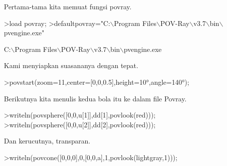 \documentclass[a4paper,10pt]{article}
\begin{document}
\begin{eulernotebook}
\begin{eulercomment}
\begin{eulercomment}
\begin{eulercomment}
\begin{eulercomment}
\begin{eulercomment}
\begin{eulercomment}
\begin{eulercomment}
\begin{eulercomment}
\begin{eulercomment}
\begin{eulercomment}
\begin{eulercomment}
\begin{eulercomment}
\begin{eulercomment}
\begin{eulercomment}
\begin{eulercomment}
\begin{eulercomment}
\begin{eulercomment}
\begin{eulercomment}
\begin{eulercomment}
\begin{eulercomment}
\begin{eulercomment}
\begin{eulercomment}
\begin{eulercomment}
\begin{eulercomment}
\begin{eulercomment}
\begin{eulercomment}
\begin{eulercomment}
\begin{eulercomment}
\begin{eulercomment}
\begin{eulercomment}
\begin{eulercomment}
\begin{eulercomment}
\begin{eulercomment}
\begin{eulercomment}
\begin{eulercomment}
\begin{eulercomment}
\begin{eulercomment}
\begin{eulercomment}
\begin{eulercomment}
\begin{eulercomment}
\begin{eulercomment}
\begin{eulercomment}
\begin{eulercomment}
Pertama-tama kita memuat fungsi povray.
\end{eulercomment}
\begin{eulerprompt}
>load povray;
>defaultpovray="C:\(\backslash\)Program Files\(\backslash\)POV-Ray\(\backslash\)v3.7\(\backslash\)bin\(\backslash\)pvengine.exe"
\end{eulerprompt}
\begin{euleroutput}
  C:\(\backslash\)Program Files\(\backslash\)POV-Ray\(\backslash\)v3.7\(\backslash\)bin\(\backslash\)pvengine.exe
\end{euleroutput}
\begin{eulercomment}
Kami menyiapkan suasananya dengan tepat.
\end{eulercomment}
\begin{eulerprompt}
>povstart(zoom=11,center=[0,0,0.5],height=10°,angle=140°);
\end{eulerprompt}
\begin{eulercomment}
Berikutnya kita menulis kedua bola itu ke dalam file Povray.
\end{eulercomment}
\begin{eulerprompt}
>writeln(povsphere([0,0,u[1]],dd[1],povlook(red)));
>writeln(povsphere([0,0,u[2]],dd[2],povlook(red)));
\end{eulerprompt}
\begin{eulercomment}
Dan kerucutnya, transparan.
\end{eulercomment}
\begin{eulerprompt}
>writeln(povcone([0,0,0],0,[0,0,a],1,povlook(lightgray,1)));

\end{eulerprompt}
\end{eulercomment}
\end{eulercomment}
\end{eulercomment}
\end{eulercomment}
\end{eulercomment}
\end{eulercomment}
\end{eulercomment}
\end{eulercomment}
\end{eulercomment}
\end{eulercomment}
\end{eulercomment}
\end{eulercomment}
\end{eulercomment}
\end{eulercomment}
\end{eulercomment}
\end{eulercomment}
\end{eulercomment}
\end{eulercomment}
\end{eulercomment}
\end{eulercomment}
\end{eulercomment}
\end{eulercomment}
\end{eulercomment}
\end{eulercomment}
\end{eulercomment}
\end{eulercomment}
\end{eulercomment}
\end{eulercomment}
\end{eulercomment}
\end{eulercomment}
\end{eulercomment}
\end{eulercomment}
\end{eulercomment}
\end{eulercomment}
\end{eulercomment}
\end{eulercomment}
\end{eulercomment}
\end{eulercomment}
\end{eulercomment}
\end{eulercomment}
\end{eulercomment}
\end{eulercomment}
\end{eulernotebook}
\end{document}
